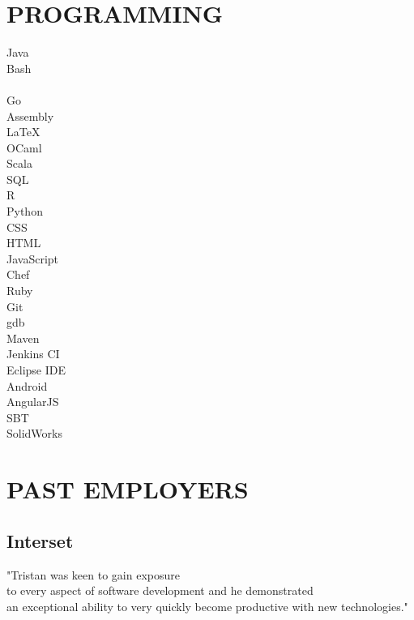 \documentclass[letterpaper]{deedy-resume-modified} %
\begin{document}
{\begin{minipage}[t]{0.32\textwidth}
\section*{\color{White}PROGRAMMING}

Java \tab {\bf + + + + +}\\
Bash \tab {\bf + + + + +}\\
\CPP \tab {\bf + + + +}\\
Go \tab {\bf + + +}\\
Assembly \tab {\bf + + +}\\
\LaTeX \tab {\bf + + +}\\
OCaml \tab {\bf + + +}\\
Scala \tab {\bf + + +}\\
SQL \tab {\bf + + +}\\
R \tab {\bf + + +}\\
Python \tab {\bf + + +}\\
CSS \tab {\bf + + +}\\
HTML \tab {\bf + + +}\\
JavaScript \tab {\bf + +}\\
Chef \tab {\bf + +}\\
Ruby \tab {\bf + +}\\

\sectionspace
{}
Git \tab {\bf + + + + +}\\
gdb \tab {\bf + + + +}\\
Maven \tab {\bf + + + +}\\
Jenkins CI \tab {\bf + + + +}\\
Eclipse IDE \tab {\bf + + +}\\
Android \tab {\bf + + +}\\
AngularJS \tab {\bf + + +}\\
SBT \tab {\bf + + +}\\
SolidWorks \tab {\bf + +}\\

\sectionspace


\section*{\color{White}PAST EMPLOYERS}
\subsection{Interset}
"Tristan was keen to gain exposure\\to every aspect of software development and he demonstrated\\an exceptional ability to very quickly become productive with new technologies." \\


\end{minipage}} %
\end{document}
